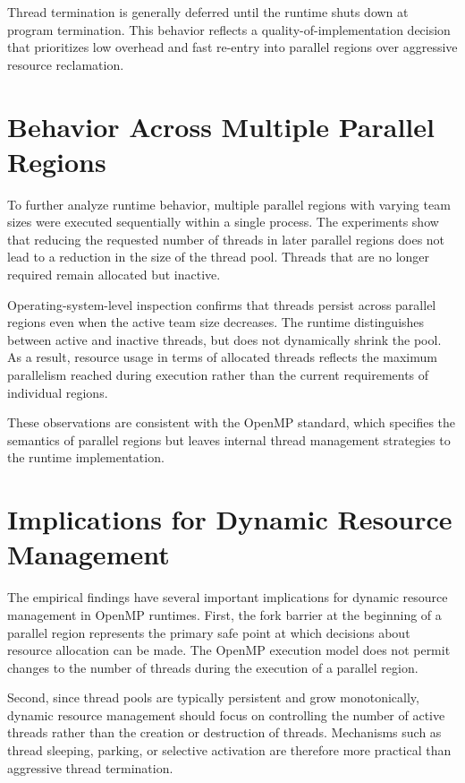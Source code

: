 Thread termination is generally deferred until the runtime shuts down at program termination. This behavior reflects a quality-of-implementation decision that prioritizes low overhead and fast re-entry into parallel regions over aggressive resource reclamation.

\section{Behavior Across Multiple Parallel Regions}

To further analyze runtime behavior, multiple parallel regions with varying team sizes were executed sequentially within a single process. The experiments show that reducing the requested number of threads in later parallel regions does not lead to a reduction in the size of the thread pool. Threads that are no longer required remain allocated but inactive.

Operating-system-level inspection confirms that threads persist across parallel regions even when the active team size decreases. The runtime distinguishes between active and inactive threads, but does not dynamically shrink the pool. As a result, resource usage in terms of allocated threads reflects the maximum parallelism reached during execution rather than the current requirements of individual regions.

These observations are consistent with the OpenMP standard, which specifies the semantics of parallel regions but leaves internal thread management strategies to the runtime implementation.

\section{Implications for Dynamic Resource Management}

The empirical findings have several important implications for dynamic resource management in OpenMP runtimes. First, the fork barrier at the beginning of a parallel region represents the primary safe point at which decisions about resource allocation can be made. The OpenMP execution model does not permit changes to the number of threads during the execution of a parallel region.

Second, since thread pools are typically persistent and grow monotonically, dynamic resource management should focus on controlling the number of active threads rather than the creation or destruction of threads. Mechanisms such as thread sleeping, parking, or selective activation are therefore more practical than aggressive thread termination.

